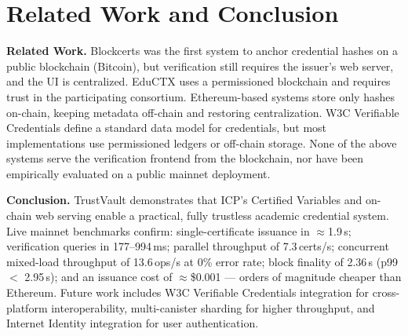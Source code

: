 \documentclass[conference]{IEEEtran}
\begin{document}
\section{Related Work and Conclusion}
\label{sec:relconc}

\textbf{Related Work.} Blockcerts \cite{grech2017blockchain} was the first system to anchor credential hashes on a public blockchain (Bitcoin), but verification still requires the issuer's web server, and the UI is centralized. EduCTX \cite{turk2018eductx} uses a permissioned blockchain and requires trust in the participating consortium. Ethereum-based systems \cite{lizcano2020blockchain} store only hashes on-chain, keeping metadata off-chain and restoring centralization. W3C Verifiable Credentials \cite{w3c2022vc} define a standard data model for credentials, but most implementations use permissioned ledgers or off-chain storage. None of the above systems serve the verification frontend from the blockchain, nor have been empirically evaluated on a public mainnet deployment.

\textbf{Conclusion.} TrustVault demonstrates that ICP's Certified Variables and on-chain web serving enable a practical, fully trustless academic credential system. Live mainnet benchmarks confirm: single-certificate issuance in $\approx$1.9\,s; verification queries in 177--994\,ms; parallel throughput of 7.3\,certs/s; concurrent mixed-load throughput of 13.6\,ops/s at 0\% error rate; block finality of 2.36\,s (p99 $<$ 2.95\,s); and an issuance cost of $\approx$\$0.001 — orders of magnitude cheaper than Ethereum. Future work includes W3C Verifiable Credentials integration for cross-platform interoperability, multi-canister sharding for higher throughput, and Internet Identity integration for user authentication.
\end{document}

